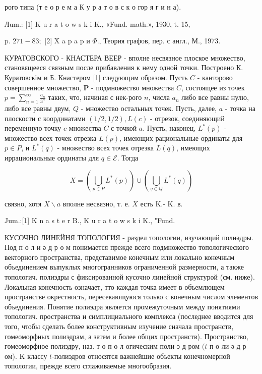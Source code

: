 \documentclass[10pt]{article}
\begin{document}
рого типа (т е о р е м а $К$ у р а т о в с к о гор я г и н а).



Лum.: [1] K u r a t o w s k i K., «Fund. math.», 1930, t. 15,

p. $271-83 ;$ [2] X a p a p и $\Phi .$, Теория графов, пер. с англ., М., 1973.



КУРАТОВСКОГО - КНАСТЕРА ВЕЕР - вполне несвязное плоское множество, становящееся связным после прибавления к нему одной точки. Построено К. Куратовскім и Б. Кнастером [1] следующим образом. Пусть $C$ - канторово совершенное множество, $\boldsymbol{P}$ - подмножество множества $C$, состоящее из точек $p=\sum_{n=1}^{\infty} \frac{a_{n}}{3^{n}}$ таких, что, начиная с нек-рого $n$, числа $a_{n}$ либо все равны нулю, либо все равны двум, $Q$ - множество остальных точек. Пусть, далее, $a$ - точка на плоскости с координатами $(1 / 2,1 / 2), L(c)$ - отрезок, соединяющий переменную точку $c$ множества $C$ с точкой $a$. Пусть, наконец, $L^{*}(p)$ - множество всех точек отрезка $L(p)$, имеющих рациональные ординаты для $p \in P$, и $L^{*}(q)$ - множество всех точек отрезка $L(q)$, имеющих иррациональные ординаты для $q \in \mathcal{E}$. Тогда



\[

X=\left(\bigcup_{p \in P} L^{*}(p)\right) \cup\left(\bigcup_{q \in Q} L^{*}(q)\right)

\]



связно, хотя $X \backslash a$ вполне несвязно, т. е. $X$ есть K.- K. в.



Jum.:[1] K n a s t e r B., K u r a t o w s k i K., "Fund.



КУСОЧНО ЛИНЕЙНЯ ТОПОЛОГИЯ - раздел топологии, изучающий полиәдры. Под п о л и ә д р о м понимается прежде всего подмножество топологического векторного пространства, представимое конечным или локально конечным объединением выпуклых многогранников ограниченной размерности, а также топологич. полиэдры с фиксированной кусочно линейной структурой (см. ниже). Локальная конечность означает, тто каждая точка имеет в объемлющем пространстве окрестность, пересекающуюся только с конечным числом элементов объединения. Понятие полиэдра является промежуточным между понятиями топологич. пространства и симплициального комплекса (последнее вводится для того, чтобы сделать более конструктивным изучение сначала пространств, гомеоморфных полиэдрам, а затем и более общих пространств). Пространство, гомеоморфное полиэдру, наз. т о п о л огическим поли э д ром $(t$-п о ли ә д р ом). K классу $t$-полиэдров относятся важнейшие объекты конечномерной топологии, прежде всего сглаживаемые многообразия.
\end{document}
